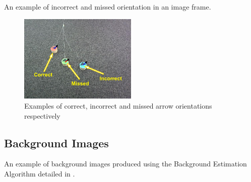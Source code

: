 \documentclass{article}
\begin{document}
An example of incorrect and missed orientation in an image frame.

\begin{figure}[h!]
	\centering
		\includegraphics[width=0.5\textwidth]{../Drawings/missedandIncorrectDetData2Ready.pdf}
	\caption{Examples of correct, incorrect and missed arrow orientations respectively}
	\label{fig:indetect}
\end{figure}


\subsection{Background Images}
\label{sec:back}
An example of background images produced using the Background Estimation Algorithm detailed in .
\end{document}
